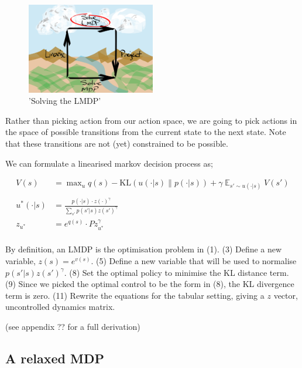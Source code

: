 \begin{figure}
\centering
\includegraphics[width=0.5\textwidth,height=0.5\textheight]{../../pictures/drawings/abstract-representations-solve.png}
\caption{'Solving the LMDP'}
\end{figure}

Rather than picking action from our action space, we are going to pick actions in
 the space of possible transitions from the current state to the next state. Note
 that these transitions are not (yet) constrained to be possible.

We can formulate a linearised markov decision process as;

\begin{align}
V(s) &= \mathop{\text{max}}_{u} q(s) - \text{KL}(u(\cdot| s) \parallel p(\cdot | s)) + \gamma \mathop{\mathbb E}_{s' \sim u(\cdot | s)} V(s') \tag{1}\\
\\
u^{* }(\cdot | s) &= \frac{p(\cdot | s)\cdot z(\cdot)^{\gamma}}{\sum_{s'} p(s' | s) z(s')^{\gamma}} \tag{8}\\
z_{u^{* }} &= e^{q(s)}\cdot P z_{u^{* }}^{\gamma} \tag{11}\\
\end{align}

By definition, an LMDP is the optimisation problem in (1). (3) Define a
new variable, \(z(s) = e^{v(s)}\). (5) Define a new variable that will
be used to normalise \(p(s' | s)z(s')^{\gamma}\). (8) Set the optimal
policy to minimise the KL distance term. (9) Since we picked the optimal
control to be the form in (8), the KL divergence term is zero. (11)
Rewrite the equations for the tabular setting, giving a \(z\) vector,
uncontrolled dynamics matrix.

(see appendix ?? for a full derivation)

\newpage

\hypertarget{a-relaxed-mdp}{%
\subsection{A relaxed MDP}\label{a-relaxed-mdp}}


